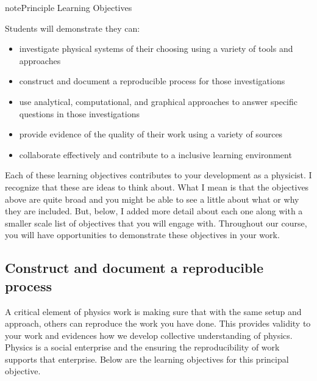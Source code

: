 \documentclass[letterpaper,10pt,english]{jupyterBook}
\begin{document}
\begin{sphinxadmonition}{note}{Principle Learning Objectives}

\sphinxAtStartPar
Students will demonstrate they can:
\begin{itemize}
\item {} 
\sphinxAtStartPar
investigate physical systems of their choosing using a variety of tools and approaches

\item {} 
\sphinxAtStartPar
construct and document a reproducible process for those investigations

\item {} 
\sphinxAtStartPar
use analytical, computational, and graphical approaches to answer specific questions in those investigations

\item {} 
\sphinxAtStartPar
provide evidence of the quality of their work using a variety of sources

\item {} 
\sphinxAtStartPar
collaborate effectively and contribute to a inclusive learning environment

\end{itemize}

\sphinxAtStartPar
Each of these learning objectives contributes to your development as a physicist. I recognize that these are  ideas to think about. What I mean is that the objectives above are quite broad and you might be able to see a little about what or why they are included. But, below, I added more detail about each one along with a smaller scale list of objectives that you will engage with. Throughout our course, you will have opportunities to demonstrate these objectives in your work. 
\end{sphinxadmonition}


\subsection{Construct and document a reproducible process}
\label{\detokenize{content/0_course/1_goals:construct-and-document-a-reproducible-process}}
\sphinxAtStartPar
A critical element of physics work is making sure that with the same setup and approach, others can reproduce the work you have done. This provides validity to your work and evidences how we develop collective understanding of physics. Physics is a social enterprise and the ensuring the reproducibility of work supports that enterprise. Below are the learning objectives for this principal objective.
\end{document}
